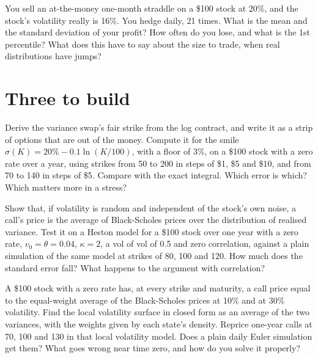 \begin{question}\label{iq:iv2:vol-surface-and-vol-trading:37}
You sell an at-the-money one-month straddle on a \$100 stock at 20\%, and the stock's volatility really is 16\%. You hedge daily, 21 times. What is the mean and the standard deviation of your profit? How often do you lose, and what is the 1st percentile? What does this have to say about the size to trade, when real distributions have jumps?
\end{question}

\section{Three to build}

\begin{question}\label{iq:iv2:vol-surface-and-vol-trading:38}
Derive the variance swap's fair strike from the log contract, and write it as a strip of options that are out of the money. Compute it for the smile $\sigma(K) = 20\% - 0.1\ln(K/100)$, with a floor of 3\%, on a \$100 stock with a zero rate over a year, using strikes from 50 to 200 in steps of \$1, \$5 and \$10, and from 70 to 140 in steps of \$5. Compare with the exact integral. Which error is which? Which matters more in a stress?
\end{question}

\begin{question}\label{iq:iv2:vol-surface-and-vol-trading:39}
Show that, if volatility is random and independent of the stock's own noise, a call's price is the average of Black-Scholes prices over the distribution of realised variance. Test it on a Heston model for a \$100 stock over one year with a zero rate, $v_0 = \theta = 0.04$, $\kappa = 2$, a vol of vol of 0.5 and zero correlation, against a plain simulation of the same model at strikes of 80, 100 and 120. How much does the standard error fall? What happens to the argument with correlation?
\end{question}

\begin{question}\label{iq:iv2:vol-surface-and-vol-trading:40}
A \$100 stock with a zero rate has, at every strike and maturity, a call price equal to the equal-weight average of the Black-Scholes prices at 10\% and at 30\% volatility. Find the local volatility surface in closed form as an average of the two variances, with the weights given by each state's density. Reprice one-year calls at 70, 100 and 130 in that local volatility model. Does a plain daily Euler simulation get them? What goes wrong near time zero, and how do you solve it properly?
\end{question}
